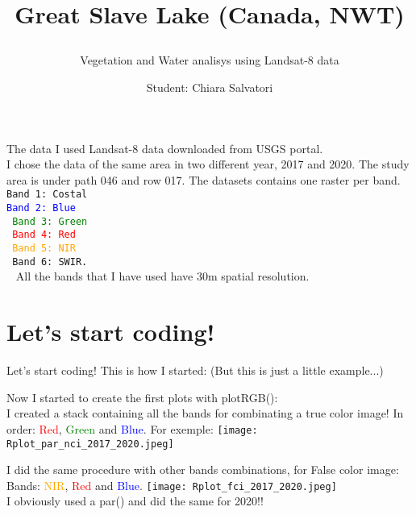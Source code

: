 \documentclass{beamer}
\title{{Great Slave Lake (Canada, NWT)}
\subtitle{{Vegetation and Water analisys using Landsat-8 data}}
}
\date{}
\author{\footnotesize{Student: Chiara Salvatori}}
\institute{
 Esame: Telerilevamento Geo-Ecologico.
 
    Professore: Duccio Rocchini
    \\
 \smallskip
 \texttt{[image: great\_slave\_lake\_intro.jpg]}
}
\begin{document}
\maketitle
\begin{frame}{The data}
    I used Landsat-8 data downloaded from USGS portal. \\ I chose the data of the same area in two different year, 2017 and 2020. The study area is under path 046 and row 017. The datasets contains one raster per band. \\ 
    \bigskip
    \texttt{\small{Band 1: Costal\\
    \textcolor{blue}{Band 2: Blue\\}
    \textcolor{green}{Band 3: Green\\}
    \textcolor{red}{Band 4: Red\\}
    \textcolor{orange}{Band 5: NIR\\}
    Band 6: SWIR. \\}
    }
    \bigskip
    All the bands that I have used have 30m spatial resolution.
\end{frame}

\section{Let's start coding!}
\begin{frame}{Let's start coding!}
 This is how I started: 
 (But this is just a little example...)
 \bigskip
    \texttt{\scriptsize{}}
    \
\end{frame}

\begin{frame}%
 Now I started to create the first plots with plotRGB():\\
 I created a stack containing all the bands for combinating a true color image! In order: \textcolor{red}{Red}, \textcolor{green}{Green} and \textcolor{blue}{Blue}.
 For exemple: 
    \texttt{\scriptsize{}}
    \texttt{[image: Rplot\_par\_nci\_2017\_2020.jpeg]}\\
\end{frame}

\begin{frame}%
 I did the same procedure with other bands combinations, for False color image:  Bands: \textcolor{orange}{NIR}, \textcolor{red}{Red} and \textcolor{blue}{Blue}.
    \texttt{\scriptsize{}}
    \texttt{[image: Rplot\_fci\_2017\_2020.jpeg]}\\
    I obviously used a par() and did the same for 2020!!
\end{frame}
\end{document}
